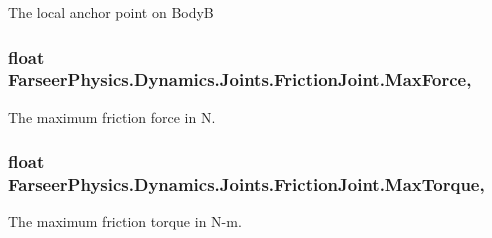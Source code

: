 The local anchor point on Body\+B 

\hypertarget{class_farseer_physics_1_1_dynamics_1_1_joints_1_1_friction_joint_abed25a2da7b68b22907da910d8db154c}{
\subsubsection[{Max\+Force}]{\setlength{\rightskip}{0pt plus 5cm}float Farseer\+Physics.\+Dynamics.\+Joints.\+Friction\+Joint.\+Max\+Force\hspace{0.3cm}{\ttfamily [get]}, {\ttfamily [set]}}}\label{class_farseer_physics_1_1_dynamics_1_1_joints_1_1_friction_joint_abed25a2da7b68b22907da910d8db154c}


The maximum friction force in N. 

\hypertarget{class_farseer_physics_1_1_dynamics_1_1_joints_1_1_friction_joint_ad38a960b1c97465ccad87aedadc931e5}{
\subsubsection[{Max\+Torque}]{\setlength{\rightskip}{0pt plus 5cm}float Farseer\+Physics.\+Dynamics.\+Joints.\+Friction\+Joint.\+Max\+Torque\hspace{0.3cm}{\ttfamily [get]}, {\ttfamily [set]}}}\label{class_farseer_physics_1_1_dynamics_1_1_joints_1_1_friction_joint_ad38a960b1c97465ccad87aedadc931e5}


The maximum friction torque in N-\/m. 

